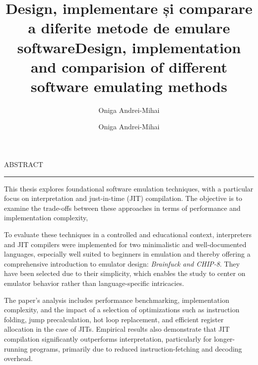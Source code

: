\documentclass[12pt]{scrreport}
\begin{document}
{

\title{Design, implementare și comparare a diferite metode de emulare software}
\author{Oniga Andrei-Mihai}
\maketitle

}

\title{Design, implementation and comparision of different software emulating methods}
\author{Oniga Andrei-Mihai}											
				
\maketitle

\newpage
\thispagestyle{empty}
\mbox{}
\newpage
{}

\cleardoublepage
ABSTRACT
\vspace{0.5cm}	
\hrule
\vspace{0.5cm}

\par This thesis explores foundational software emulation techniques, with a particular focus on interpretation and just-in-time (JIT) compilation. The objective is to examine the trade-offs between these approaches in terms of performance and implementation complexity, 

\par To evaluate these techniques in a controlled and educational context, interpreters and JIT compilers were implemented for two minimalistic and well-documented languages, especially well suited to beginners in emulation and thereby offering a comprehensive introduction to emulator design: \textit{Brainfuck and CHIP-8}. They have been selected due to their simplicity, which enables the study to center on emulator behavior rather than language-specific intricacies.

\par The paper's analysis includes performance benchmarking, implementation complexity, and the impact of a selection of optimizations such as instruction folding, jump precalculation, hot loop replacement, and efficient register allocation in the case of JITs. Empirical results also demonstrate that JIT compilation significantly outperforms interpretation, particularly for longer-running programs, primarily due to reduced instruction-fetching and decoding overhead.
\end{document}

